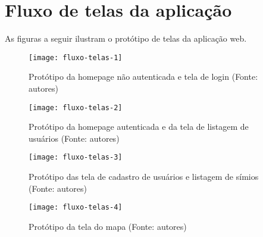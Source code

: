 \chapter{Fluxo de telas da aplicação}

As figuras a seguir ilustram o protótipo de telas da aplicação web.

\begin{figure}[ht]
  \centering
    \texttt{[image: fluxo-telas-1]}
  \caption{Protótipo da homepage não autenticada e tela de login (Fonte: autores)}
\end{figure}

\begin{figure}[ht]
  \centering
    \texttt{[image: fluxo-telas-2]}
  \caption{Protótipo da homepage autenticada e da tela de listagem de usuários (Fonte: autores)}
\end{figure}

\begin{figure}[ht]
  \centering
    \texttt{[image: fluxo-telas-3]}
  \caption{Protótipo das tela de cadastro de usuários e listagem de símios (Fonte: autores)}
\end{figure}

\begin{figure}[ht]
  \centering
    \texttt{[image: fluxo-telas-4]}
  \caption{Protótipo da tela do mapa (Fonte: autores)}
\end{figure}
